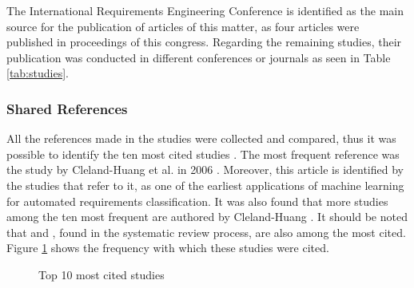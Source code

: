 \documentclass[conference]{IEEEtran}
\begin{document}
The International Requirements Engineering Conference is identified as the main source for the publication of articles of this matter, as four articles were published in proceedings of this congress. Regarding the remaining studies, their publication was conducted in different conferences or journals as seen in Table \ref{tab:studies}.

\subsubsection{Shared References}

All the references made in the studies were collected and compared, thus it was possible to identify the ten most cited studies \cite{Cleland-Huang2006, Cleland-Huang2007, Slankas2013, Glinz2007, Zhang2011AnES, 8049171, 8049172, Knauss2012, Maalej2016, Yang2015}. The most frequent reference was the study by Cleland-Huang et al. in 2006 \cite{Cleland-Huang2006}. Moreover, this article is identified by the studies that refer to it, as one of the earliest applications of machine learning for automated requirements classification. It was also found that more studies among the ten most frequent are authored by Cleland-Huang \cite{Cleland-Huang2007, Knauss2012}. It should be noted that \cite{8049172} and \cite{8049171}, found in the systematic review process, are also among the most cited. Figure \ref{fig:references} shows the frequency with which these studies were cited.

\begin{figure}[!htbp]
    \caption{\label{fig:references}Top 10 most cited studies}
\end{figure}
\end{document}
